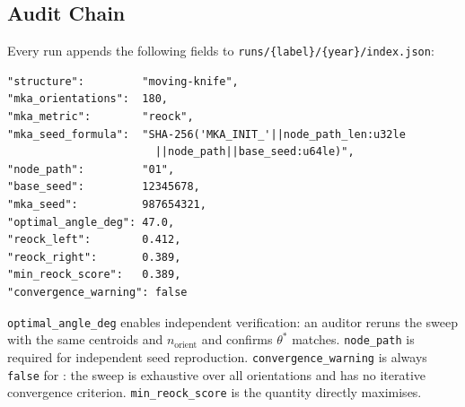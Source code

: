 \subsection{Audit Chain}
\label{subsec:audit}

Every \mka{} run appends the following fields to
\texttt{runs/\{label\}/\{year\}/index.json}:

\begin{verbatim}
"structure":         "moving-knife",
"mka_orientations":  180,
"mka_metric":        "reock",
"mka_seed_formula":  "SHA-256('MKA_INIT_'||node_path_len:u32le
                       ||node_path||base_seed:u64le)",
"node_path":         "01",
"base_seed":         12345678,
"mka_seed":          987654321,
"optimal_angle_deg": 47.0,
"reock_left":        0.412,
"reock_right":       0.389,
"min_reock_score":   0.389,
"convergence_warning": false
\end{verbatim}

\texttt{optimal\_angle\_deg} enables independent verification: an auditor
reruns the sweep with the same centroids and $n_{\mathrm{orient}}$ and confirms
$\theta^*$ matches.
\texttt{node\_path} is required for independent seed reproduction.
\texttt{convergence\_warning} is always \texttt{false} for \mka{}:
the sweep is exhaustive over all orientations and has no iterative
convergence criterion.
\texttt{min\_reock\_score} is the quantity \mka{} directly maximises.
